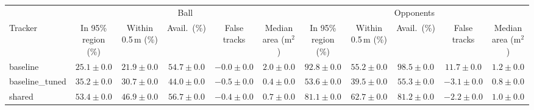 \begin{tabular}{lcccccccccc}
\toprule
 & \multicolumn{5}{c}{Ball} & \multicolumn{5}{c}{Opponents} \\
\cmidrule(lr){2-6}\cmidrule(lr){7-11}
Tracker & In 95\% region (\%) & Within 0.5\,m (\%) & Avail.\ (\%) & False tracks & Median area (m$^2$) & In 95\% region (\%) & Within 0.5\,m (\%) & Avail.\ (\%) & False tracks & Median area (m$^2$) \\
\midrule
baseline & $25.1 \pm 0.0$ & $21.9 \pm 0.0$ & $54.7 \pm 0.0$ & $-0.0 \pm 0.0$ & $2.0 \pm 0.0$ & $92.8 \pm 0.0$ & $55.2 \pm 0.0$ & $98.5 \pm 0.0$ & $11.7 \pm 0.0$ & $1.2 \pm 0.0$ \\
baseline\_tuned & $35.2 \pm 0.0$ & $30.7 \pm 0.0$ & $44.0 \pm 0.0$ & $-0.5 \pm 0.0$ & $0.4 \pm 0.0$ & $53.6 \pm 0.0$ & $39.5 \pm 0.0$ & $55.3 \pm 0.0$ & $-3.1 \pm 0.0$ & $0.8 \pm 0.0$ \\
shared & $53.4 \pm 0.0$ & $46.9 \pm 0.0$ & $56.7 \pm 0.0$ & $-0.4 \pm 0.0$ & $0.7 \pm 0.0$ & $81.1 \pm 0.0$ & $62.7 \pm 0.0$ & $81.2 \pm 0.0$ & $-2.2 \pm 0.0$ & $1.0 \pm 0.0$ \\
\bottomrule
\end{tabular}
